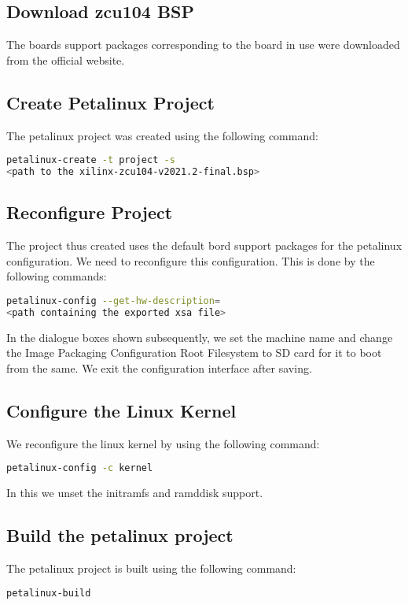 \documentclass{article}
\begin{document}
\subsection{Download zcu104 BSP}
The boards support packages corresponding to the board in use were downloaded from the official website.

\subsection{Create Petalinux Project}
The petalinux project was created using the following command:
\begin{lstlisting}[language=bash]
petalinux-create -t project -s
<path to the xilinx-zcu104-v2021.2-final.bsp>
\end{lstlisting}

\subsection{Reconfigure Project}
The project thus created uses the default bord support packages for the petalinux configuration.
We need to reconfigure this configuration. This is done by the following commands:
\begin{lstlisting}[language=bash]
petalinux-config --get-hw-description=
<path containing the exported xsa file>
\end{lstlisting}

In the dialogue boxes shown subsequently, we set the machine name and change the Image Packaging Configuration
Root Filesystem to SD card for it to boot from the same. We exit the configuration interface after saving.

\subsection{Configure the Linux Kernel}
We reconfigure the linux kernel by using the following command:
\begin{lstlisting}[language=bash]
petalinux-config -c kernel
\end{lstlisting}

In this we unset the initramfs and ramddisk support.

\subsection{Build the petalinux project}
The petalinux project is built using the following command:
\begin{lstlisting}[language=bash]
petalinux-build
\end{lstlisting}
\end{document}
